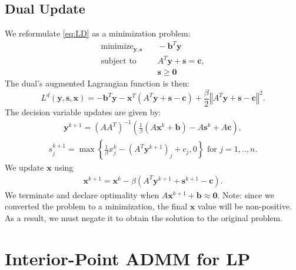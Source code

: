 \documentclass{article}
\begin{document}
\subsection*{Dual Update}
We reformulate \eqref{eq:LD} as a minimization problem:
\begin{align}
\text{minimize}_{\mathbf{y}, \mathbf{s}} &\quad -\mathbf{b}^T\mathbf{y}  \tag{LDR}\label{eq:LDR} \\
\text{subject to } &\quad  A^T \mathbf{y}  + \mathbf{s} = \mathbf{c},  \nonumber \\
&\quad \mathbf{s} \geq \mathbf{0} \nonumber
\end{align}
The dual's augmented Lagrangian function is then:
\[
L^{d}(\mathbf{y},\mathbf{s},\mathbf{x})=-\mathbf{b}^{T}\mathbf{y}-\mathbf{x}^{T}\left(A^{T}\mathbf{y}+\mathbf{s}-\mathbf{c}\right)+\frac{\beta}{2}\left\Vert A^{T}\mathbf{y}+\mathbf{s}-\mathbf{c}\right\Vert ^{2}.
\]
The decision variable updates are given by:
\begin{align}\label{eq:y_dual_update}
\mathbf{y}^{k+1} = \left(AA^{T}\right)^{-1}\left(\frac{1}{\beta}\left(A\mathbf{x}^{k}+\mathbf{b}\right)-A\mathbf{s}^{k}+A\mathbf{c}\right),
\end{align}
\begin{align}\label{eq:s_dual_update}
s_j^{k+1} = \max\left\{ \frac{1}{\beta}{x}_j^k-(A^{T}\mathbf{y}^{k+1})_j+{c}_j,0\right\}  \text{ for $j = 1,..,n$}.
\end{align}
We update $\mathbf{x}$ using
\begin{align}\label{eq:x_dual_update}
\mathbf{x}^{k+1} = \mathbf{x}^k - \beta\left(A^T \mathbf{y}^{k+1} + \mathbf{s}^{k+1} - \mathbf{c}\right).
\end{align}
We terminate and declare optimality when $A \mathbf{x}^{k+1} + \mathbf{b} \approx \mathbf{0}$. Note: since we converted the problem to a minimization, the final $\mathbf{x}$ value will be non-positive. As a result, we must negate it to obtain the solution to the original problem.

\section{Interior-Point ADMM for LP}
\end{document}
